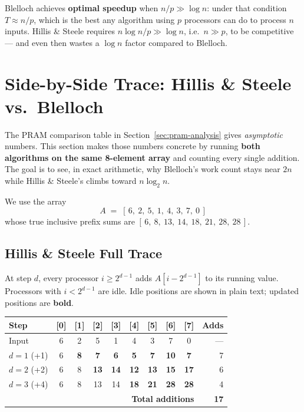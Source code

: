 \noindent Blelloch achieves \textbf{optimal speedup} when $n/p \gg \log n$:
under that condition $T \approx n/p$, which is the best any algorithm using
$p$ processors can do to process $n$ inputs. Hillis \& Steele requires
$n \log n / p \gg \log n$, i.e.\ $n \gg p$, to be competitive --- and even
then wastes a $\log n$ factor compared to Blelloch.

\section{Side-by-Side Trace: Hillis \& Steele vs.\ Blelloch}
\label{sec:sidebyside}

The PRAM comparison table in Section~\ref{sec:pram-analysis} gives
\emph{asymptotic} numbers. This section makes those numbers concrete by
running \textbf{both algorithms on the same 8-element array} and
counting every single addition. The goal is to see, in exact arithmetic,
why Blelloch's work count stays near $2n$ while Hillis \& Steele's
climbs toward $n \log_2 n$.

We use the array
\[
A \;=\; [\,6,\ 2,\ 5,\ 1,\ 4,\ 3,\ 7,\ 0\,]
\]
whose true inclusive prefix sums are
$[\,6,\ 8,\ 13,\ 14,\ 18,\ 21,\ 28,\ 28\,]$.

\subsection{Hillis \& Steele Full Trace}

At step $d$, every processor $i \ge 2^{d-1}$ adds $A[i - 2^{d-1}]$
to its running value. Processors with $i < 2^{d-1}$ are idle.
Idle positions are shown in plain text; updated positions are
\textbf{bold}.

\begin{center}
\renewcommand{\arraystretch}{1.25}
\begin{tabular}{lccccccccr}
\toprule
\textbf{Step} & [0] & [1] & [2] & [3] & [4] & [5] & [6] & [7]
              & \textbf{Adds} \\
\midrule
Input         & 6 & 2 & 5 & 1 & 4 & 3 & 7 & 0 & --- \\
$d=1$ (+1)    & 6 & \textbf{8} & \textbf{7} & \textbf{6} &
                \textbf{5} & \textbf{7} & \textbf{10} & \textbf{7} & 7 \\
$d=2$ (+2)    & 6 & 8 & \textbf{13} & \textbf{14} &
                \textbf{12} & \textbf{13} & \textbf{15} & \textbf{17} & 6 \\
$d=3$ (+4)    & 6 & 8 & 13 & 14 &
                \textbf{18} & \textbf{21} & \textbf{28} & \textbf{28} & 4 \\
\midrule
\multicolumn{9}{r}{\textbf{Total additions}} & \textbf{17} \\
\bottomrule
\end{tabular}
\end{center}

